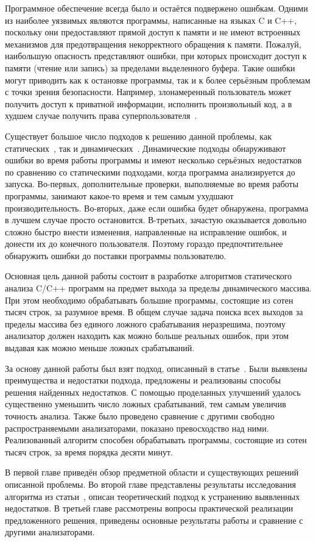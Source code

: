 
Программное обеспечение всегда было и остаётся подвержено
ошибкам. Одними из наиболее уязвимых являются программы, написанные на
языках C и C++, поскольку они предоставляют прямой доступ к памяти и
не имеют встроенных механизмов для предотвращения некорректного
обращения к памяти. Пожалуй, наибольшую опасность представляют ошибки,
при которых происходит доступ к памяти (чтение или запись) за
пределами выделенного буфера. Такие ошибки могут приводить как к
остановке программы, так и к более серьёзным проблемам с точки зрения
безопасности. Например, злонамеренный пользователь может получить
доступ к приватной информации, исполнить произвольный код, а в худшем
случае получить права суперпользователя~\cite{onesmashing}.

Существует большое число подходов к решению данной проблемы, как
статических~\cite{wagner2000first, xie2003archer, ganapathy2003buffer,
le2008marple, li2010practical}, так и
динамических~\cite{cowan1998stackguard,
ruwase2004practical}. Динамические подходы обнаруживают ошибки во
время работы программы и имеют несколько серьёзных недостатков по
сравнению со статическими подходами, когда программа анализируется до
запуска. Во-первых, дополнительные проверки, выполняемые во время
работы программы, занимают какое-то время и тем самым ухудшают
производительность. Во-вторых, даже если ошибка будет обнаружена,
программа в лучшем случае просто остановится. В-третьих, зачастую
оказывается довольно сложно быстро внести изменения, направленные на
исправление ошибок, и донести их до конечного пользователя. Поэтому
гораздо предпочтительнее обнаружить ошибки до поставки программы
пользователю.

Основная цель данной работы состоит в разработке алгоритмов
статического анализа C/C++ программ на предмет выхода за пределы
динамического массива. При этом необходимо обрабатывать большие
программы, состоящие из сотен тысяч строк, за разумное время. В общем
случае задача поиска всех выходов за пределы массива без единого
ложного срабатывания неразрешима, поэтому анализатор должен находить
как можно больше реальных ошибок, при этом выдавая как можно меньше
ложных срабатываний.

За основу данной работы был взят подход, описанный в
статье~\cite{li2010practical}. Были выявлены преимущества и недостатки
подхода, предложены и реализованы способы решения найденных
недостатков. С помощью проделанных улучшений удалось существенно
уменьшить число ложных срабатываний, тем самым увеличив точность
анализа. Также было проведено сравнение с другими свободно
распространяемыми анализаторами, показано превосходство над
ними. Реализованный алгоритм способен обрабатывать программы,
состоящие из сотен тысяч строк, за время порядка десяти минут.

В первой главе приведён обзор предметной области и существующих
решений описанной проблемы. Во второй главе представлены результаты
исследования алгоритма из статьи~\cite{li2010practical}, описан
теоретический подход к устранению выявленных недостатков. В третьей
главе рассмотрены вопросы практической реализации предложенного
решения, приведены основные результаты работы и сравнение с другими
анализаторами.

